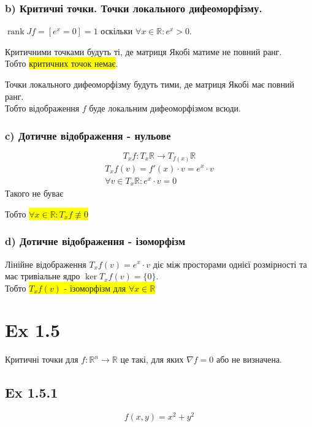 \documentclass[10pt, a4paper]{article} %
\newcommand{\R}{\mathbb{R}}
\DeclareMathOperator{\rank}{rank}
\begin{document}
\subsubsection*{b) Критичні точки. Точки локального дифеоморфізму.}
$\rank Jf = [e^x = 0] = 1$ оскільки $\forall x\in\R: e^x > 0$.

Критичними точками будуть ті, де матриця Якобі матиме не повний ранг.\\
Тобто \colorbox{yellow}{критичних точок немає}.

Точки локального дифеоморфізму будуть тими, де матриця Якобі має повний ранг.\\
Тобто відображення $f$ буде локальним дифеоморфізмом всюди.

\subsubsection*{c) Дотичне відображення - нульове}
\[T_{x}f : T_{x}\R \to T_{f(x)}\R\]
\begin{gather*}
    T_{x}f(v) = f'(x) \cdot v = e^x \cdot v\\
    \forall v\in T_{x}\R: e^x \cdot v = 0
\end{gather*}
Такого не буває

Тобто \colorbox{yellow}{$\forall x\in\R: T_{x}f \nequiv 0$}

\subsubsection*{d) Дотичне відображення - ізоморфізм}

Лінійне відображення $T_{x}f(v) = e^x \cdot v$ діє між просторами однієї розмірності та має тривіальне ядро $\ker T_{x}f(v) = \{0\}$. \\
Тобто \colorbox{yellow}{$T_{x}f(v)$ - ізоморфізм для $\forall x\in \R$}


\section*{Ex 1.5}

Критичні точки для $f : \R^n \to \R$ це такі, для яких $\nabla f = 0$ або не визначена.

\subsection*{Ex 1.5.1}
\begin{mdframed}
    \[f(x,y) = x^2 + y^2\]
\end{mdframed}
\end{document}
